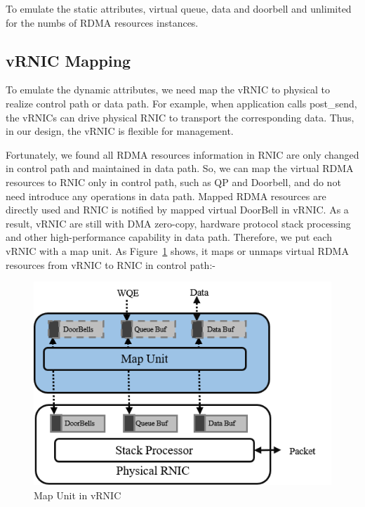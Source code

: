 To emulate the static attributes, virtual queue, data and doorbell and unlimited for the numbs of RDMA resources instances. 

\subsection{vRNIC Mapping}
To emulate the dynamic attributes, we need map the vRNIC to physical to realize control path or data path. For example, when application calls post\_send, the vRNICs can drive physical RNIC to transport the corresponding data. Thus, in our design, the vRNIC is flexible for management. 

Fortunately, we found all RDMA resources information in RNIC are only changed in control path and maintained in data path. So, we can map the virtual RDMA resources to RNIC only in control path, such as QP and Doorbell,  and do not need introduce any operations in data path. Mapped RDMA resources are directly used and RNIC is notified by mapped virtual DoorBell in vRNIC. As a result, vRNIC are still with DMA zero-copy, hardware protocol stack processing and other high-performance capability in data path. Therefore, we put each vRNIC with a map unit. As Figure~\ref{fig:map-unit} shows, it maps or unmaps virtual RDMA resources from vRNIC to RNIC in control path:-


\begin{figure}[!ht]
	\centering
	\includegraphics[width=0.9\linewidth]{images/map-unit}
	\caption{Map Unit in vRNIC}
	\label{fig:map-unit}
\end{figure}

